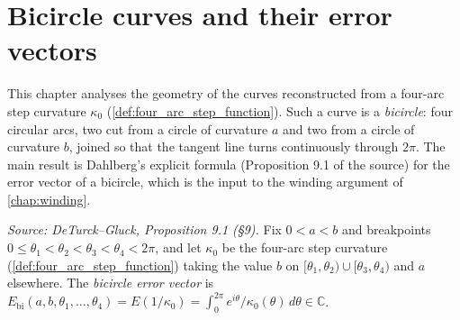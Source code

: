 \chapter{Bicircle curves and their error vectors}
\label{chap:bicircle}


This chapter analyses the geometry of the curves reconstructed from a four-arc
step curvature $\kappa_0$ (\cref{def:four_arc_step_function}). Such a curve is a
\emph{bicircle}: four circular arcs, two cut from a circle of curvature $a$ and
two from a circle of curvature $b$, joined so that the tangent line turns
continuously through $2\pi$. The main result is Dahlberg's explicit formula
(Proposition 9.1 of the source) for the error vector of a bicircle, which is the
input to the winding argument of \cref{chap:winding}.

\begin{definition}

  \label{def:bicircle_error_vector}
  \textit{Source: DeTurck--Gluck, Proposition 9.1 (§9).}
  Fix $0 < a < b$ and breakpoints $0 \le \theta_1 < \theta_2 < \theta_3 <
  \theta_4 < 2\pi$, and let $\kappa_0$ be the four-arc step curvature
  (\cref{def:four_arc_step_function}) taking the value $b$ on
  $[\theta_1,\theta_2)\cup[\theta_3,\theta_4)$ and $a$ elsewhere. The
  \emph{bicircle error vector} is $E_{\mathrm{bi}}(a,b,\theta_1,\dots,\theta_4) =
  E(1/\kappa_0) = \int_0^{2\pi} e^{i\theta}/\kappa_0(\theta)\,d\theta \in
  \mathbb{C}$.
\end{definition}


